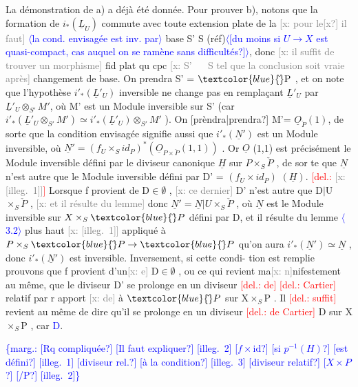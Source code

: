 \documentclass[11pt]{article}
\newcommand{\hand}[1]{\textcolor{blue}{#1}}
\newcommand{\inserted}[2][]{\textcolor{blue}{$\langle$#2$\rangle$}}
\newcommand{\margin}[1]{\textcolor{blue}{\{\textsf{marg.:} #1\}}}
\newcommand{\deleted}[1]{\textcolor{red}{[\textsf{del.:} #1]}}
\newcommand{\xout}[1]{\textcolor{gray}{[\textsf{x:} #1]}}
\newcommand{\unsure}[1]{[#1?]}
\newcommand{\illegible}[1]{[\textsf{illeg.\ #1}]}
\begin{document}
La démonstration de a) a déjà été donnée. Pour prouver b), notons
que la formation de $i_*(\underline{L}_U)$ commute avec toute extension plate de la
\xout{pour le\unsure{x} il faut} \inserted[typed]{la cond. envisagée est inv. par}
base S' \quad S (réf)\inserted{\unsure{du moins si $U\to X$ est quasi-compact, cas auquel on se ramène sans difficultés}}, donc \xout{il suffit de trouver un morphisme} fid plat qu cpc
\xout{S' $\quad$ S tel que la conclusion soit vraie après} changement de base. On
prendra S' = $\hand{\check{}}\mathrm{P}$ , et on note que l'hypothèse $i'_*(\underline{L}'_U)$ inversible ne
change pas en remplaçant $\underline{L}'_U$ par $\underline{L}'_U\otimes_{S'}M'$, où M' est un Module inversible
sur S' (car $i'_*(\underline{L}'_U\otimes_{S'}M')\simeq i'_*(\underline{L}'_U)\otimes_{S'}M'$ ). On \unsure{prèndra|prendra} M'= $\underline{O}_{\check{P}}(1)$, de
sorte que la condition envisagée signifie aussi que $i'_*(\underline{N}')$ est un Module
inversible, où $\underline{N}'= (f_U\times_S id_P)^*(\underline{O}_{P\times\check{P}}(1,1))$ . Or $\underline{O}$ (1,1) est précisément
le Module inversible défini par le diviseur canonique $\underline{H}$ sur $P\times_S\check{P}$ , de sor%
te que $\underline{N}$ n'est autre que le Module inversible défini par \qquad D' =
$(f_U\times id_P)$ $(\underline{H})$. \deleted{\xout{\illegible{1}}} Lorsque f provient de D$\in\emptyset$ , \xout{ce dernier}
D' n'est autre que D$|$U$\times_S\check{P}$ , \xout{et il résulte du lemme} donc $\underline{N}' = \underline{N}|U\times_S\check{P}$ ,
où $\underline{N}$ est le Module inversible sur $X\times_S\hand{\check{}}P$ défini par D, et il résulte
du lemme \inserted{3.2} plus haut \xout{\illegible{1}} appliqué à $P\times_S\hand{\check{}}P\to\hand{\check{}}P$ qu'on aura
$i'_*(\underline{N}')\simeq\underline{N}$ , donc $i'_*(\underline{N}')$ est inversible. Inversement, si cette condi-%
tion est remplie prouvons que f provient d'un\xout{e} D$\in\emptyset$ , ou ce qui revient
ma\xout{n}nifestement au même, que le diviseur D' se prolonge en un diviseur \deleted{de}
\deleted{Cartier} relatif par r apport \xout{de} à $\hand{\check{}}P$ sur X$\times_S$P . Il \deleted{suffit} revient au même
de dire qu'il se prolonge en un diviseur \deleted{de Cartier} D sur X$\times_S$P , car \hand{D}.

\margin{\unsure{Rq compliquée} \unsure{Il faut expliquer} \illegible{2} \unsure{$f\times\mathrm{id}$} \unsure{si $p^{-1}(H)$} \unsure{est défini} \illegible{1} \unsure{diviseur rel.} \unsure{à la condition} \illegible{3} \unsure{diviseur relatif} \unsure{$X\times P$} \unsure{/P} \illegible{2}}
\end{document}
